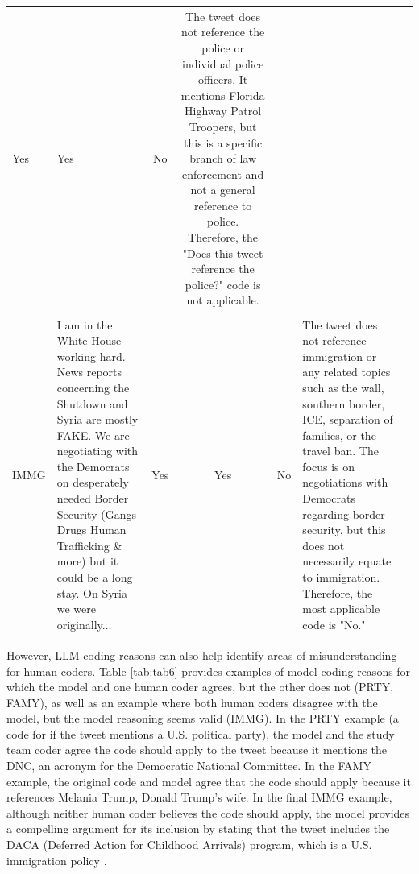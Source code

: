 \documentclass{article}
\begin{document}
\begin{table}[!htb]
\begin{tabular}{@{}lp{4cm}cccp{4.5cm}l@{}}
  Yes &
  Yes &
  No &
  The tweet does not reference the police or individual police officers. It mentions Florida Highway Patrol Troopers, but this is a specific branch of law enforcement and not a general reference to police. Therefore, the "Does this tweet reference the police?" code is not applicable. \\ \\ 
IMMG &
  I am in the White House working hard. News reports concerning the Shutdown and Syria are mostly FAKE. We are negotiating with the Democrats on desperately needed Border Security (Gangs Drugs Human Trafficking \& more) but it could be a long stay. On Syria we were originally... &
  Yes &
  Yes &
  No &
  The tweet does not reference immigration or any related topics such as the wall, southern border, ICE, separation of families, or the travel ban. The focus is on negotiations with Democrats regarding border security, but this does not necessarily equate to immigration. Therefore, the most applicable code is "No." \\ \bottomrule
\end{tabular}
\label{tab:tab5}
\end{table}

However, LLM coding reasons can also help identify areas of misunderstanding for human coders. Table \ref{tab:tab6} provides examples of model coding reasons for which the model and one human coder agrees, but the other does not (PRTY, FAMY), as well as an example where both human coders disagree with the model, but the model reasoning seems valid (IMMG).  In the PRTY example (a code for if the tweet mentions a U.S. political party), the model and the study team coder agree the code should apply to the tweet because it mentions the DNC, an acronym for the Democratic National Committee.  In the FAMY example, the original code and model agree that the code should apply because it references Melania Trump, Donald Trump’s wife.  In the final IMMG example, although neither human coder believes the code should apply, the model provides a compelling argument for its inclusion by stating that the tweet includes the DACA (Deferred Action for Childhood Arrivals) program, which is a U.S. immigration policy \cite{johnson_lessons_2018}.
\end{document}
